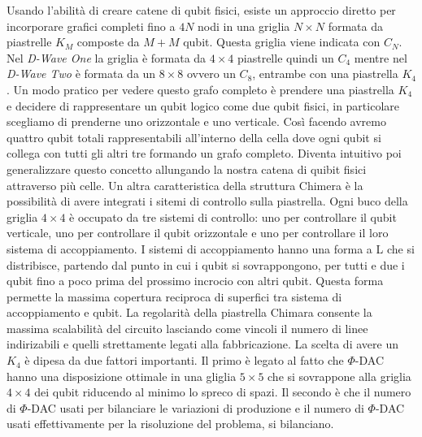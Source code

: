Usando l'abilità di creare catene di qubit fisici, esiste un approccio diretto per incorporare grafici completi fino a $4N$ nodi in una griglia $N \times N$ formata da piastrelle $K_M$ composte da $M + M$ qubit. Questa griglia viene indicata con $C_N$. Nel \textit{D-Wave One} la griglia è formata da $4\times4$ piastrelle quindi un $C_4$ mentre nel \textit{D-Wave Two} è formata da un $8\times8$ ovvero un $C_8$, entrambe con una piastrella $K_4$. Un modo pratico per vedere questo grafo completo è prendere una piastrella $K_4$ e decidere di rappresentare un qubit logico come due qubit fisici, in particolare scegliamo di prenderne uno orizzontale e uno verticale. Così facendo avremo quattro qubit totali rappresentabili all'interno della cella dove ogni qubit si collega con tutti gli altri tre formando un grafo completo. Diventa intuitivo poi generalizzare questo concetto allungando la nostra catena di quibit fisici attraverso più celle. Un altra caratteristica della struttura Chimera è la possibilità di avere integrati i sitemi di controllo sulla piastrella. Ogni buco della griglia $4\times4$ è occupato da tre sistemi di controllo: uno per controllare il qubit verticale, uno per controllare il qubit orizzontale e uno per controllare il loro sistema di accoppiamento. I sistemi di accoppiamento hanno una forma a L che si distribisce, partendo dal punto in cui i qubit si sovrappongono, per tutti e due i qubit fino a poco prima del prossimo incrocio con altri qubit. Questa forma permette la massima copertura reciproca di superfici tra sistema di accoppiamento e qubit.
La regolarità della piastrella Chimara consente la massima scalabilità del circuito lasciando come vincoli il numero di linee indirizabili e quelli strettamente legati alla fabbricazione. La scelta di avere un $K_4$ è dipesa da due fattori importanti. Il primo è legato al fatto che $\Phi$-DAC hanno una disposizione ottimale in una gliglia $5\times5$ che si sovrappone alla griglia $4\times4$ dei qubit riducendo al minimo lo spreco di spazi. Il secondo è che il numero di $\Phi$-DAC usati per bilanciare le variazioni di produzione e il numero di $\Phi$-DAC usati effettivamente per la risoluzione del problema, si bilanciano.

